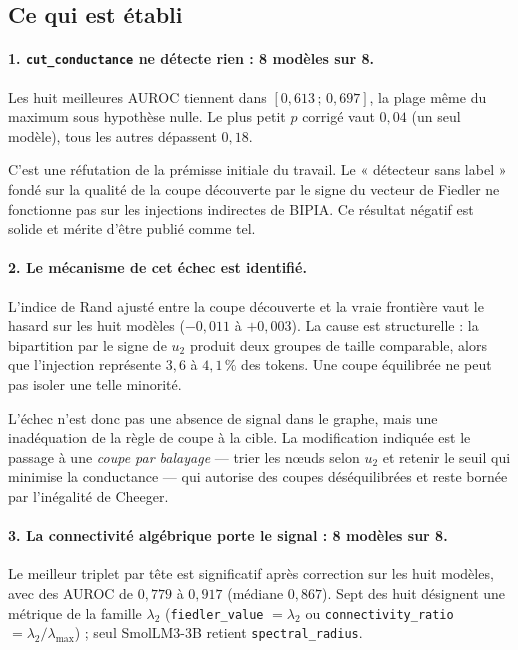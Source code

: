 \documentclass[11pt,a4paper]{article}
\begin{document}
\subsection{Ce qui est établi}

\paragraph{1. \texttt{cut\_conductance} ne détecte rien : 8 modèles sur 8.}
Les huit meilleures AUROC tiennent dans $[0{,}613\,;\,0{,}697]$, la plage même
du maximum sous hypothèse nulle. Le plus petit $p$ corrigé vaut $0{,}04$ (un
seul modèle), tous les autres dépassent $0{,}18$.

C'est une réfutation de la prémisse initiale du travail. Le « détecteur sans
label » fondé sur la qualité de la coupe découverte par le signe du vecteur de
Fiedler ne fonctionne pas sur les injections indirectes de BIPIA. Ce résultat
négatif est solide et mérite d'être publié comme tel.

\paragraph{2. Le mécanisme de cet échec est identifié.}
L'indice de Rand ajusté entre la coupe découverte et la vraie frontière vaut le
hasard sur les huit modèles ($-0{,}011$ à $+0{,}003$). La cause est
structurelle : la bipartition par le signe de $u_2$ produit deux groupes de
taille comparable, alors que l'injection représente $3{,}6$ à $4{,}1\,\%$ des
tokens. Une coupe équilibrée ne peut pas isoler une telle minorité.

L'échec n'est donc pas une absence de signal dans le graphe, mais une
inadéquation de la règle de coupe à la cible. La modification indiquée est le
passage à une \emph{coupe par balayage} --- trier les n\oe uds selon $u_2$ et
retenir le seuil qui minimise la conductance --- qui autorise des coupes
déséquilibrées et reste bornée par l'inégalité de Cheeger.

\paragraph{3. La connectivité algébrique porte le signal : 8 modèles sur 8.}
Le meilleur triplet par tête est significatif après correction sur les huit
modèles, avec des AUROC de $0{,}779$ à $0{,}917$ (médiane $0{,}867$). Sept des
huit désignent une métrique de la famille $\lambda_2$
(\texttt{fiedler\_value} $=\lambda_2$ ou
\texttt{connectivity\_ratio} $=\lambda_2/\lambda_{\max}$) ; seul SmolLM3-3B
retient \texttt{spectral\_radius}.
\end{document}
